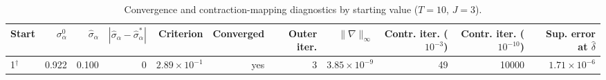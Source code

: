 \begin{table}[H]
\centering\small
\caption{Convergence and contraction-mapping diagnostics by starting value ($T=10$, $J=3$).}\label{tab:q8e_convergence}
\begin{adjustbox}{max width=\linewidth}
\begin{tabular}{lrrrrrrrrrr}
\toprule
Start & $\sigma_\alpha^{0}$ & $\hat\sigma_\alpha$ & $|\hat\sigma_\alpha-\hat\sigma_\alpha^{*}|$ & Criterion & Converged & Outer iter. & $\|\nabla\|_\infty$ & Contr. iter. ($10^{-3}$) & Contr. iter. ($10^{-10}$) & Sup. error at $\hat\delta$ \\
\midrule
1$^{\dagger}$ & 0.922 & 0.100 & 0 & $2.89\times 10^{-1}$ & yes & 3 & $3.85\times 10^{-9}$ & 49 & 10000 & $1.71\times 10^{-6}$ \\
\bottomrule
\end{tabular}
\end{adjustbox}
\par{}
\end{table}

